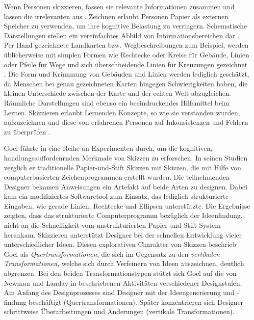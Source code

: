\medskip Wenn Personen skizzieren, fassen sie relevante Informationen zusammen und lassen die irrelevanten aus \citep{Tversky:2002}. Zeichnen erlaubt Personen Papier als externen Speicher zu verwenden, um ihre kognitive Belastung zu verringern. Schematische Darstellungen stellen ein vereinfachtes Abbild von Informationsbereichen dar \citep{Tversky:2000}. Per Hand gezeichnete Landkarten bzw. Wegbeschreibungen zum Beispiel, werden üblicherweise mit simplen Formen wie Rechtecke oder Kreise für Gebäude, Linien oder Pfeile für Wege und sich überschneidende Linien für Kreuzungen gezeichnet \citep{Tversky:1999}. Die Form und Krümmung von Gebäuden und Linien werden lediglich geschätzt, da Menschen bei genau gezeichneten Karten hingegen Schwierigkeiten haben, die kleinen Unterschiede zwischen der Karte und der echten Welt abzugleichen. Räumliche Darstellungen sind ebenso ein beeindruckendes Hilfsmittel beim Lernen. Skizzieren erlaubt Lernenden Konzepte, so wie sie verstanden wurden, aufzuzeichnen und diese von erfahrenen Personen auf Inkonsistenzen und Fehlern zu überprüfen \citep{Forbus:2008}.

\medskip Goel führte in \citep{Goel:1995} eine Reihe an Experimenten durch, um die kognitiven, handlungsauffordenrnden Merkmale von Skizzen zu erforschen. In seinen Studien verglich er traditionelle Papier-und-Stift Skizzen mit Skizzen, die mit Hilfe von computerbasierten Zeichenprogrammen erstellt wurden. Die teilnehmenden Designer bekamen Anweisungen ein Artefakt auf beide Arten zu designen. Dabei kam ein modifiziertes Softwaretool zum Einsatz, das lediglich strukturierte Eingaben, wie gerade Linien, Rechtecke und Ellipsen unterstützte.  Die Ergebnisse zeigten, dass das strukturierte Computerprogramm bezüglich der Ideenfindung, nicht an die Schnelligkeit vom unstrukturierten Papier-und-Stift System herankam. Skizzieren unterstützt Designer bei der schnellen Entwicklung vieler unterschiedlicher Ideen. Diesen explorativen Charakter von Skizzen beschrieb Goel als \emph{Quertransformationen}, die sich im Gegensatz zu den \emph{vertikalen Transformationen}, welche sich durch Verfeinern von Ideen auszeichnen, deutlich abgrenzen. Bei den beiden Transformationstypen stützt sich Goel auf die von Newman und Landay in \citep{Newman:2000} beschriebenen Aktivitäten verschiedener Designstufen. Am Anfang des Designprozesses sind Designer mit der Ideengenerierung und -findung beschäftigt (Quertransformationen). Später konzentrieren sich Designer schrittweise Überarbeitungen und Änderungen (vertikale Transformationen).

